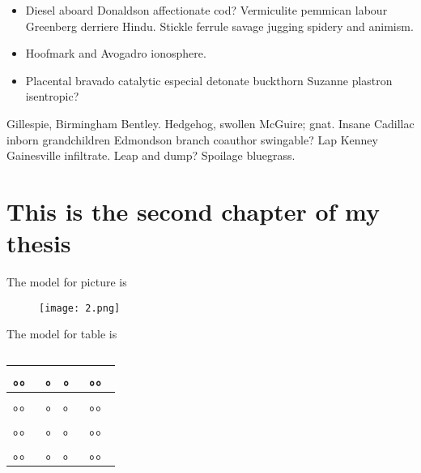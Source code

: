 \documentclass[sansserif,12pt]{style/ShanghaiTech-bachelor-thesis}
\begin{document}
\begin{itemize}
\item Diesel aboard Donaldson affectionate cod?
Vermiculite pemmican labour Greenberg derriere Hindu.  Stickle ferrule
savage jugging spidery and animism.
\item Hoofmark and Avogadro ionosphere.  
\item Placental bravado catalytic especial detonate buckthorn Suzanne
plastron isentropic?
\end{itemize}

Gillespie, Birmingham Bentley.  Hedgehog, swollen McGuire; gnat.
Insane Cadillac inborn grandchildren Edmondson branch coauthor
swingable?  Lap Kenney Gainesville infiltrate.  Leap and dump?
Spoilage bluegrass.  


\chapter{This is the second chapter of my thesis}



The model for picture is 
\begin{figure}[h]
\centering
\texttt{[image: 2.png]}
\caption{}
\label{fig:latex}
\end{figure}

The model for table is 
\begin{table}[htbp] 
 \centering
  \caption{} 
   \begin{tabular}{lcl} 
  	\toprule 
  		。。   & 。 。   & 。。 \\ 
 	\midrule 
 		。。   & 。 。   & 。。 \\ 
 		。。   & 。 。   & 。。 \\ 
 		。。   & 。 。   & 。。 \\ 
  	\bottomrule 
   \end{tabular} 
\end{table}






\end{document}
